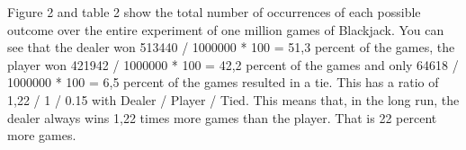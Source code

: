 

Figure 2 and table 2 show the total number of occurrences of each possible outcome over the entire experiment of one million games of Blackjack. You can see that the dealer won 513440 / 1000000 * 100 = 51,3 percent of the games, the player won 421942 / 1000000 * 100 = 42,2 percent of the games and only 64618 / 1000000 * 100 = 6,5 percent of the games resulted in a tie. This has a ratio of 1,22 / 1 / 0.15 with Dealer / Player / Tied. This means that, in the long run, the dealer always wins 1,22 times more games than the player. That is 22 percent more games.

 
